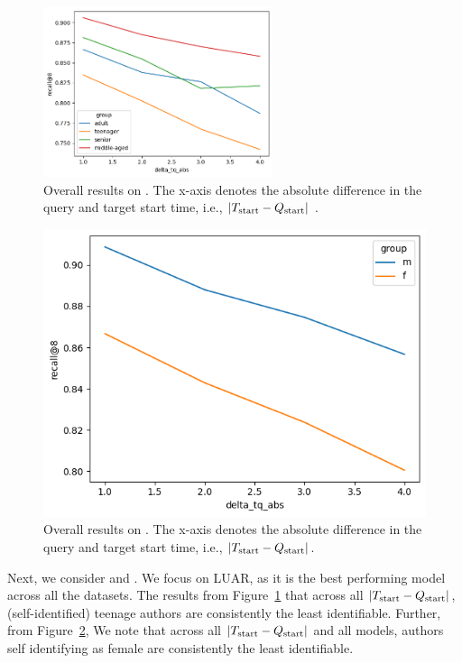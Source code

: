 \begin{figure}[h]
    \centering
    \includegraphics[width=0.6\textwidth]{stylometryExtensions/figures/demo/varydelta_demographic_groupwise_age.png}
    \caption{Overall results on \DSagevary{}. The x-axis denotes the absolute difference in the query and target start time, i.e., $|T_{\rm{start}} - Q_{\rm{start}}|$ .}
    \label{fig:demographic_vary:age}
\end{figure}

\begin{figure}[h]
    \centering
    \includegraphics[height=0.6\textwidth]{stylometryExtensions/figures/demo/varydelta_demographic_groupwise_gender.png}
    \caption{Overall results on \DSgendervary{}. The x-axis denotes the absolute difference in the query and target start time, i.e., $|T_{\rm{start}} - Q_{\rm{start}}|$. }
    \label{fig:demographic_vary:gender}
\end{figure}

Next, we consider \DSagevary{} and \DSgendervary{}.
We focus on LUAR, as it is the best performing model across all the datasets.
The results from Figure~\ref{fig:demographic_vary:age} that across all $|T_{\rm{start}} - Q_{\rm{start}}|$, (self-identified) teenage authors are consistently the least identifiable.
Further, from Figure~\ref{fig:demographic_vary:gender}, We note that across all $|T_{\rm{start}} - Q_{\rm{start}}|$ and all models, authors self identifying as female are consistently the least identifiable.



